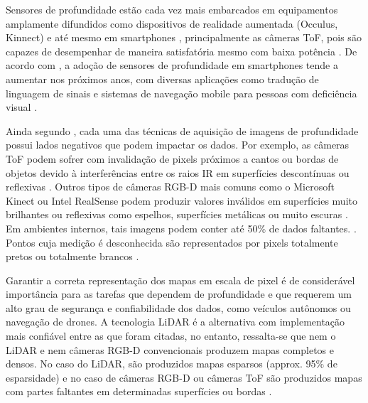 Sensores de profundidade estão cada vez mais embarcados em equipamentos amplamente difundidos como dispositivos de realidade aumentada (Occulus, Kinnect) e até mesmo em smartphones \cite{du2020depthlab}, principalmente as câmeras ToF, pois são capazes de desempenhar de maneira satisfatória mesmo com baixa potência \cite{branscombe2018microsoft}. De acordo com \cite{xie2021ultradepth}, a adoção de sensores de profundidade em smartphones tende a aumentar nos próximos anos, com diversas aplicações como tradução de linguagem de sinais \cite{park2021enabling} e sistemas de navegação mobile para pessoas com deficiência visual \cite{see2022smartphone}.


Ainda segundo \cite{castellano2023performance}, cada uma das técnicas de aquisição de imagens de profundidade possui lados negativos que podem impactar os dados. Por exemplo, as câmeras ToF podem sofrer com invalidação de pixels próximos a cantos ou bordas de objetos devido à interferências entre os raios IR em superfícies descontínuas ou reflexivas \cite{hansard2012time}. Outros tipos de câmeras RGB-D mais comuns como o Microsoft Kinect ou Intel RealSense podem produzir valores inválidos em superfícies muito brilhantes ou reflexivas como espelhos, superfícies metálicas ou muito escuras \cite{zollhofer2019commodity}. Em ambientes internos, tais imagens podem conter até 50\% de dados faltantes. \cite{zhang2022indepth} \cite{zhang2018deep}. Pontos cuja medição é desconhecida são representados por pixels totalmente pretos ou totalmente brancos \cite{dourado2020multi}.



Garantir a correta representação dos mapas em escala de pixel é de considerável importância para as tarefas que dependem de profundidade e que requerem um alto grau de segurança e confiabilidade dos dados, como veículos autônomos ou navegação de drones. A tecnologia LiDAR é a alternativa com implementação mais confiável entre as que foram citadas, no entanto, ressalta-se que nem o LiDAR e nem câmeras RGB-D convencionais produzem mapas completos e densos. No caso do LiDAR, são produzidos mapas esparsos (approx. 95\% de esparsidade) e no caso de câmeras RGB-D ou câmeras ToF são produzidos mapas com partes faltantes em determinadas superfícies ou bordas \cite{hu2012robust}. 





